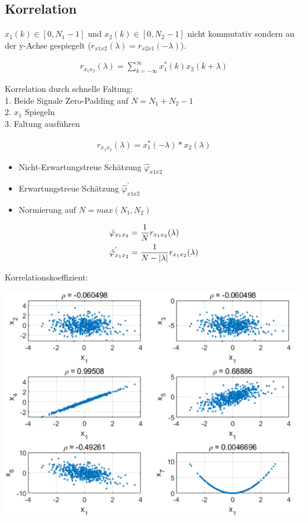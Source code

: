 \documentclass[10pt,a4paper]{article}
\begin{document}
  \subsection{Korrelation}
  $x_1(k) \in [0,N_1-1]$ und $x_2(k) \in [0,N_2-1]$ nicht kommutativ sondern an der y-Achse gespiegelt ($r_{x1x2}(\lambda)=r_{x2x1}(-\lambda)$).
  \begin{mdframed}[style=exercise]
    \begin{align}
        r_{x_1x_2}(\lambda) = \sum_{k=-\infty}^{\infty}x_1^*(k) x_2(k+\lambda)
    \end{align}
  \end{mdframed}
Korrelation durch schnelle Faltung:\\
1. Beide Signale Zero-Padding auf $N = N_1+N_2-1$\\
2. $x_1$ Spiegeln\\
3. Faltung ausführen
  \begin{mdframed}[style=exercise]
    \begin{align}
        r_{x_1x_2}(\lambda) = x_1^*(-\lambda)*x_2(\lambda)
    \end{align}
  \end{mdframed}
\begin{itemize}
    \item Nicht-Erwartungstreue Schätzung $\hat{\varphi}_{x1x2}$
    \item Erwartungstreue Schätzung $\hat{\varphi}_{x1x2}^{'}$
    \item Normierung auf $N = max(N_1,N_2)$
\end{itemize}
  \begin{mdframed}[style=exercise]
    \begin{align}
        \hat{\varphi}_{x_1x_2} &= \frac{1}{N} r_{x_1x_2}(\lambda)\\
        \hat{\varphi}_{x_1x_2}^{'} &= \frac{1}{N-\abs{\lambda}} r_{x_1x_2}(\lambda)
    \end{align}
  \end{mdframed}
Korrelationskoeffizient:
  \begin{center}
      \includegraphics[width=.35\textwidth]{./img/korkoeff.png}
  \end{center}
\end{document}
